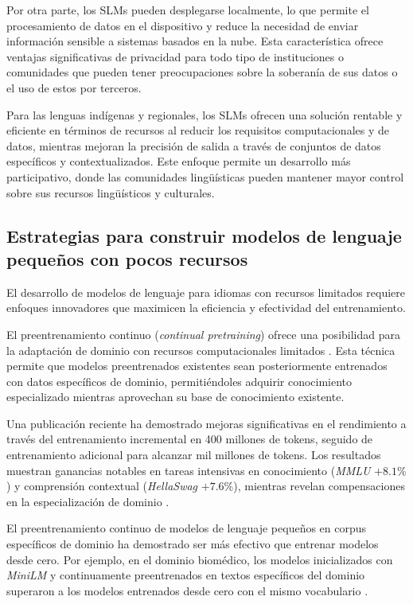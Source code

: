 \documentclass[10pt,twoside]{rcmart} %
\begin{document}
Por otra parte, los SLMs pueden desplegarse localmente, lo que permite el procesamiento de datos en el dispositivo y reduce la necesidad de enviar información sensible a sistemas basados en la nube. Esta característica ofrece ventajas significativas de privacidad para todo tipo de instituciones o comunidades que pueden tener preocupaciones sobre la soberanía de sus datos o el uso de estos por terceros.

Para las lenguas indígenas y regionales, los SLMs ofrecen una solución rentable y eficiente en términos de recursos al reducir los requisitos computacionales y de datos, mientras mejoran la precisión de salida a través de conjuntos de datos específicos y contextualizados. Este enfoque permite un desarrollo más participativo, donde las comunidades lingüísticas pueden mantener mayor control sobre sus recursos lingüísticos y culturales.

\subsection{Estrategias para construir modelos de lenguaje pequeños con pocos recursos}

El desarrollo de modelos de lenguaje para idiomas con recursos limitados requiere enfoques innovadores que maximicen la eficiencia y efectividad del entrenamiento.

El preentrenamiento continuo (\textit{continual pretraining}) ofrece una posibilidad para la adaptación de dominio con recursos computacionales limitados \cite{wu2024continual}. Esta técnica permite que modelos preentrenados existentes sean posteriormente entrenados con datos específicos de dominio, permitiéndoles adquirir conocimiento especializado mientras aprovechan su base de conocimiento existente.

Una publicación reciente ha demostrado mejoras significativas en el rendimiento a través del entrenamiento incremental en 400 millones de tokens, seguido de entrenamiento adicional para alcanzar mil millones de tokens. Los resultados muestran ganancias notables en tareas intensivas en conocimiento (\textit{MMLU} $+8.1\%$) y comprensión contextual (\textit{HellaSwag} $+7.6\%$), mientras revelan compensaciones en la especialización de dominio \cite{ishibashi2025mining}.

El preentrenamiento continuo de modelos de lenguaje pequeños en corpus específicos de dominio ha demostrado ser más efectivo que entrenar modelos desde cero. Por ejemplo, en el dominio biomédico, los modelos inicializados con \textit{MiniLM} y continuamente preentrenados en textos específicos del dominio superaron a los modelos entrenados desde cero con el mismo vocabulario \cite{yan2023af}.
\end{document}
